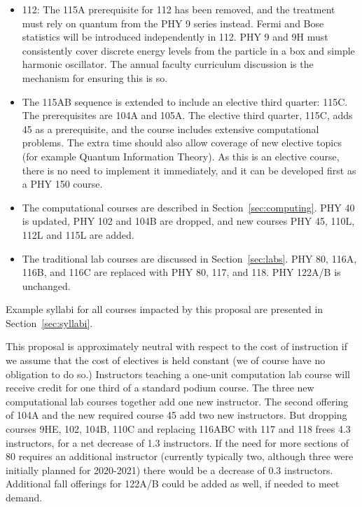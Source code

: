 \documentclass[12pt]{article}
\begin{document}
\begin{itemize}
\item 112: The 115A prerequisite for 112 has been removed, and the
  treatment must rely on quantum from the PHY 9 series instead.  Fermi
  and Bose statistics will be introduced independently in 112.  PHY 9
  and 9H must consistently cover discrete energy levels from the
  particle in a box and simple harmonic oscillator.  The annual
  faculty curriculum discussion is the mechanism for ensuring this is
  so.
    
\item The 115AB sequence is extended to include an elective third
  quarter: 115C.  The prerequisites are 104A and 105A.  The elective
  third quarter, 115C, adds 45 as a prerequisite, and the course
  includes extensive computational problems.  The extra time should
  also allow coverage of new elective topics (for example Quantum
  Information Theory).  As this is an elective course, there is no
  need to implement it immediately, and it can be developed first as a
  PHY 150 course.

\item The computational courses are described in
  Section~\ref{sec:computing}. PHY 40 is updated, PHY 102 and 104B are
  dropped, and new courses PHY 45, 110L, 112L and 115L are added.

\item The traditional lab courses are discussed in
  Section~\ref{sec:labs}. PHY 80, 116A, 116B, and 116C are replaced with
  PHY 80, 117, and 118.  PHY 122A/B is unchanged.
  
\end{itemize}
Example syllabi for all courses impacted by this proposal are
presented in Section~\ref{sec:syllabi}.

This proposal is approximately neutral with respect to the cost of
instruction if we assume that the cost of electives is held constant
(we of course have no obligation to do so.)  Instructors teaching a
one-unit computation lab course will receive credit for one third of a
standard podium course.  The three new computational lab courses
together add one new instructor.  The second offering of 104A and the
new required course 45 add two new instructors.  But dropping courses
9HE, 102, 104B, 110C and replacing 116ABC with 117 and 118 frees 4.3
instructors, for a net decrease of 1.3 instructors.  If the need for
more sections of 80 requires an additional instructor (currently
typically two, although three were initially planned for 2020-2021)
there would be a decrease of 0.3 instructors.  Additional fall
offerings for 122A/B could be added as well, if needed to meet demand.
\end{document}
